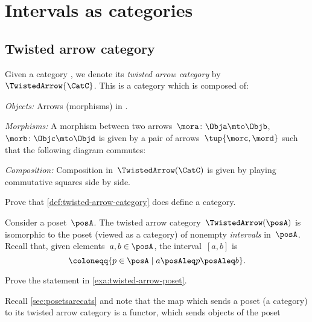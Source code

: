 \section{Intervals as categories}

\subsection{Twisted arrow category}

\begin{ctdefinition}\label{def:twisted-arrow-category}
  \label{def:twisted-arrow}
  Given a category \CatC, we denote its \emph{twisted arrow category} by~$\TwistedArrow{\CatC}$. This is a category which is composed of:
  \begin{compactenum}
    \item \emph{Objects:} Arrows (morphisms) in \CatC.
    \item \emph{Morphisms:} A morphism between two arrows~$\mora\colon \Obja \mto \Objb $,~$\morb\colon \Objc \mto \Objd$ is given by a pair of arrows~$\tup{\morc,\mord}$ such that the following diagram commutes:
    \begin{center}
    \end{center}
    \item \emph{Composition:} Composition in~$\TwistedArrow(\CatC)$ is given by playing commutative squares side by side.
  \end{compactenum}
\end{ctdefinition}

\begin{gradedexercise}
Prove that \cref{def:twisted-arrow-category} does define a category.
\end{gradedexercise}


\begin{example}[Intervals]
  \label{exa:twisted-arrow-poset}
  Consider a poset~$\posA$.
  The twisted arrow category~$\TwistedArrow(\posA)$ is isomorphic to the poset (viewed as a category) of nonempty \emph{intervals} in~$\posA$.
  Recall that, given elements~$a, b \in \posA$, the interval~$[a,b]$ is
  \begin{equation*}
  [a,b]\coloneqq \{p \in \posA \mid a\posAleq p \posAleq b\}.
  \end{equation*}
\end{example}

\begin{exercise}
Prove the statement in \cref{exa:twisted-arrow-poset}.
\end{exercise}
\begin{solution}
\end{solution}
\begin{remark}
  Recall \cref{sec:posetsarecats} and note that the map which sends a poset (a category) to its twisted arrow category is a functor, which sends objects of the poset
\end{remark}